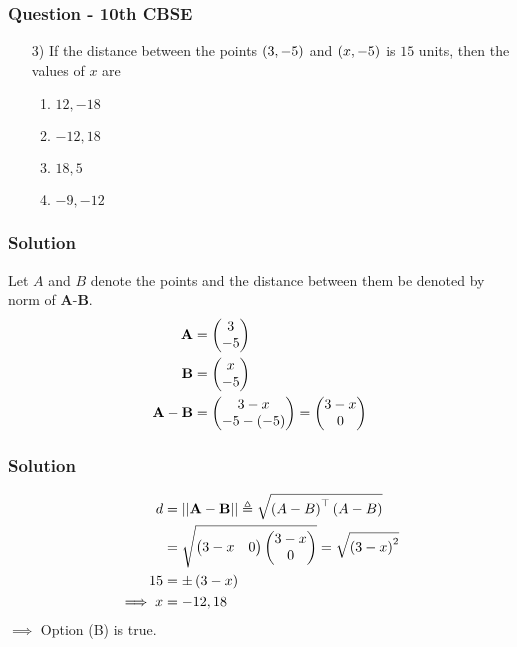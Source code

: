 \documentclass{beamer}
\begin{document}
\begin{frame}
\frametitle{Question - 10th CBSE}
\begin{enumerate}
    \item [3)]
If the distance between the points $\left(3,-5\right)$ and $\left(x,-5\right)$ is $15$ units, then the values of $x$ are
\begin{enumerate}
\item $12,-18$
\item $-12,18$
\item $18,5$
\item $-9,-12$
\end{enumerate}
\end{enumerate}
\end{frame}




\begin{frame}
\frametitle{Solution}
Let $A$ and $B$ denote the points and the distance between them be denoted by norm of $\textbf{A}$-$\textbf{B}$.
\begin{align}
\textbf{A} &=
    \begin{pmatrix}
3 \\
-5 
\end{pmatrix}\\
\textbf{B} &=
    \begin{pmatrix}
x \\
-5 
\end{pmatrix}\\
\textbf{A}-\textbf{B} &= \begin{pmatrix}
        3-x\\
        -5 -\left(-5\right)
    \end{pmatrix} = \begin{pmatrix}
        3-x\\
        0
    \end{pmatrix}
    \end{align}
\end{frame}




\begin{frame}
\frametitle{Solution}
\begin{align}
    d &= \lvert\lvert \textbf{A}-\textbf{B} \rvert\rvert \triangleq \sqrt{\left(A-B\right)^\top\left(A-B\right)}\\
&= \sqrt{\begin{pmatrix}
        3-x & 0
    \end{pmatrix}
\begin{pmatrix}
        3-x\\
        0
    \end{pmatrix}}
     = \sqrt{\left(3-x\right)^2}\\
  15 &= \pm\left(3-x\right)\\
 \implies  x &= -12,18
\end{align}
$\implies$ Option (B) is true.
\end{frame}
\end{document}
